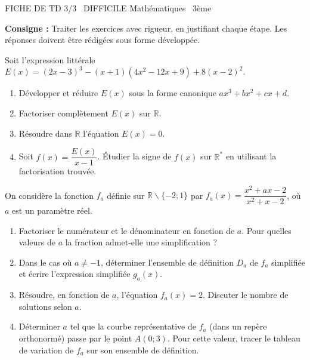 \documentclass[11pt]{article}
\def\setminus{\mathbin{\backslash}}\let\smallsetminus\setminus
\begin{document}
\begin{tcolorbox}[enhanced,colback=popink,colframe=popink,arc=10pt,boxrule=0pt,left=12pt,right=12pt,top=9pt,bottom=9pt]
{\color{white}\popxbold\small FICHE DE TD 3/3 \textbullet\ DIFFICILE \hfill Mathématiques \textbullet\ 3ème\par}
\end{tcolorbox}
\vspace{4pt}
\noindent \textbf{Consigne :} Traiter les exercices avec rigueur, en justifiant chaque étape. Les réponses doivent être rédigées sous forme développée.

\begin{exercice}
Soit l'expression littérale $E(x) = (2x-3)^3 - (x+1)(4x^2 - 12x + 9) + 8(x-2)^2$.
\begin{enumerate}
    \item Développer et réduire $E(x)$ sous la forme canonique $ax^3+bx^2+cx+d$.
    \item Factoriser complètement $E(x)$ sur $\mathbb{R}$.
    \item Résoudre dans $\mathbb{R}$ l'équation $E(x) = 0$.
    \item Soit $f(x) = \dfrac{E(x)}{x-1}$. Étudier la signe de $f(x)$ sur $\mathbb{R}^*$ en utilisant la factorisation trouvée.
\end{enumerate}
\end{exercice}

\begin{exercice}
On considère la fonction $f_a$ définie sur $\mathbb{R}\setminus\{-2; 1\}$ par $f_a(x) = \dfrac{x^2 + ax - 2}{x^2 + x - 2}$, où $a$ est un paramètre réel.
\begin{enumerate}
    \item Factoriser le numérateur et le dénominateur en fonction de $a$. Pour quelles valeurs de $a$ la fraction admet-elle une simplification ?
    \item Dans le cas où $a \neq -1$, déterminer l'ensemble de définition $D_a$ de $f_a$ simplifiée et écrire l'expression simplifiée $g_a(x)$.
    \item Résoudre, en fonction de $a$, l'équation $f_a(x) = 2$. Discuter le nombre de solutions selon $a$.
    \item Déterminer $a$ tel que la courbe représentative de $f_a$ (dans un repère orthonormé) passe par le point $A(0; 3)$. Pour cette valeur, tracer le tableau de variation de $f_a$ sur son ensemble de définition.
\end{enumerate}
\end{exercice}
\end{document}
